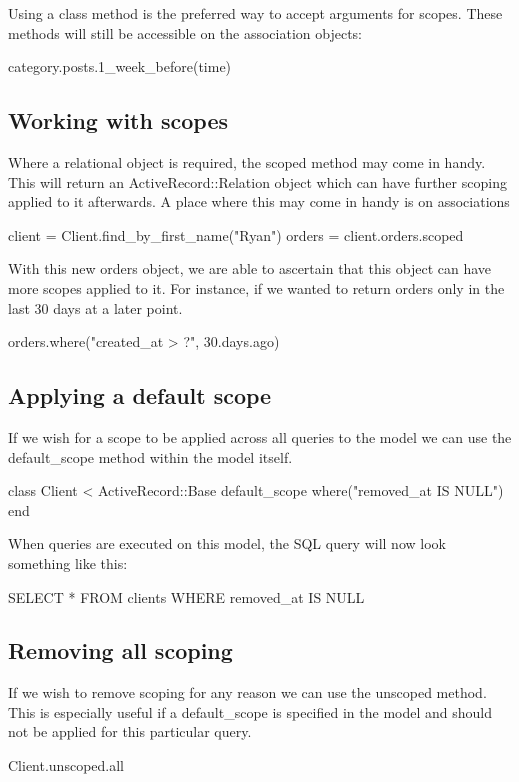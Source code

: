 \documentclass[10pt]{book}
\newenvironment{code}{%
  \scriptsize
    \verbatim
}{%
    \endverbatim
    \newline
}
\begin{document}
Using a class method is the preferred way to accept arguments for  scopes. These methods will still be accessible on the association  objects:
\begin{code}
category.posts.1_week_before(time)
\end{code}

\subsection{ Working with scopes}

Where a relational object is required, the scoped method may come in handy. This will return an ActiveRecord::Relation object which can have further scoping applied to it afterwards. A place where this may come in handy is on associations
\begin{code}
client = Client.find_by_first_name("Ryan")
orders = client.orders.scoped
\end{code}

With this new orders object, we are able to ascertain that  this object can have more scopes applied to it. For instance, if we  wanted to return orders only in the last 30 days at a later point.
\begin{code}
orders.where("created_at > ?", 30.days.ago)
\end{code}

\subsection{ Applying a default scope}

If we wish for a scope to be applied across all queries to the model we can use the default\_scope method within the model itself.
\begin{code}
class Client < ActiveRecord::Base
  default_scope where("removed_at IS NULL")
end
\end{code}

When queries are executed on this model, the SQL query will now look something like this:
\begin{code}
SELECT * FROM clients WHERE removed_at IS NULL
\end{code}

\subsection{ Removing all scoping}

If we wish to remove scoping for any reason we can use the unscoped method. This is especially useful if a default\_scope is specified in the model and should not be applied for this particular query.
\begin{code}
Client.unscoped.all
\end{code}
\end{document}
